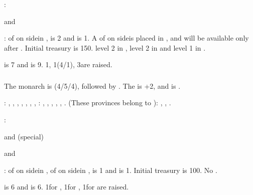 :
\begin{modlist}
\item[\SUB] \paysgenes
\item[\RM] \payspapaute and \paysnaples
\end{modlist}

:
\bparag \MNU of  on side\facemoins in \provinceToledo, \FTI is 2
and \DTI is 1. A \MNU of  on side\faceplus is placed in
\provinceVlaanderen, and will be available only after .
\bparag Initial treasury is 150\ducats.
\bparag \TradeFLEET level 2 in , level 2 in  and level
1 in .

\aparag {} is 7 and  is
9. 1\ARMY\faceplus, 1\FLEET\facemoins (4\NGD/1\NTD), 3\ND are raised.


\subsubsection{\paysmajeurPologne}
\aparag The monarch is  (4/5/4), followed by
. The \STAB is +2, and \POL is .

: \provinceWielkopolska, , \provinceDanzig, \provinceLublin, \provinceMalopolska,
\provinceWolyn, \provincePrypec,
: \provinceLietuva, \provinceSmolenska,
\provinceBaltarusija, \provinceSeveria, \provinceZemaitija, \provincePolacak.
 (These provinces belong to \paysUkraine):
\provinceUkrainya, \provincePodolie, \provincePoltava.

:
\begin{modlist}
\item[\VASSAL] \paysMazovie and \paysUkraine (special)
\item[\RM] \paysHongrie and \paysBoheme
\end{modlist}

:
\bparag \MNU of  on side\facemoins in \provinceLietuva, \MNU of
 on side\facemoins in \provinceWielkopolska, \FTI is 1 and \DTI is
1.
\bparag Initial treasury is 100\ducats.
\bparag No \TradeFLEET.

\aparag {} is 6 and  is
6. 1\ARMY\faceplus for \paysmajeurPologne, 1\ARMY\faceplus for \paysLithuanie,
1\ARMY\facemoins for \paysUkraine are raised.


